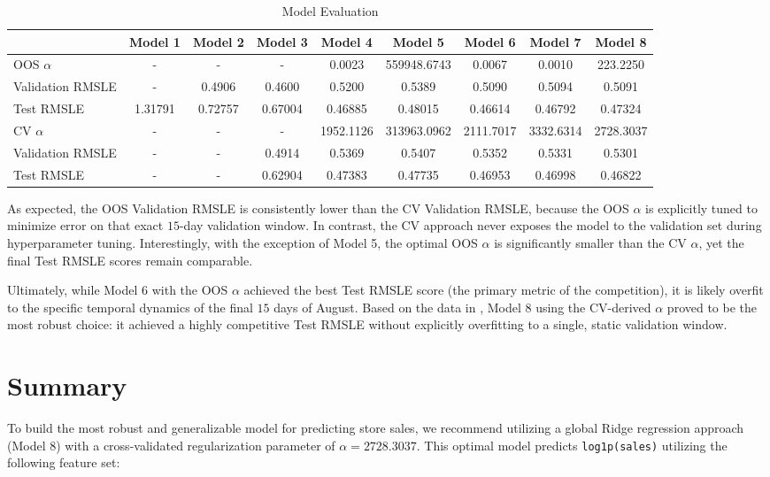 \documentclass{article}
\begin{document}
\begin{table}[H]
\centering
\caption{Model Evaluation}
\label{tab: Model Evaluation}
\begin{tabular}{lcccccccc} 
\toprule
 & Model 1 & Model 2 & Model 3 & Model 4 & Model 5 & Model 6 & Model 7 & Model 8 \\ 
\midrule
OOS $\alpha$ & - & - & - & 0.0023 & 559948.6743 & 0.0067 & 0.0010 & 223.2250 \\ 
Validation RMSLE & - & 0.4906 & 0.4600 & 0.5200 & 0.5389 & 0.5090 & 0.5094 & 0.5091 \\ 
Test RMSLE & 1.31791 & 0.72757 & 0.67004 & 0.46885 & 0.48015 & 0.46614 & 0.46792 & 0.47324 \\ 
\midrule
CV $\alpha$ & - & - & - & 1952.1126 & 313963.0962 & 2111.7017 & 3332.6314 & 2728.3037 \\ 
Validation RMSLE & - & - & 0.4914 & 0.5369 & 0.5407 & 0.5352 & 0.5331 & 0.5301 \\ 
Test RMSLE & - & - & 0.62904 & 0.47383 & 0.47735 & 0.46953 & 0.46998 & 0.46822 \\ 
\bottomrule
\end{tabular}
\end{table}

As expected, the OOS Validation RMSLE is consistently lower than the CV Validation RMSLE, because the OOS $\alpha$ is explicitly tuned to minimize error on that exact $15$-day validation window. In contrast, the CV approach never exposes the model to the validation set during hyperparameter tuning. Interestingly, with the exception of Model 5, the optimal OOS $\alpha$ is significantly smaller than the CV $\alpha$, yet the final Test RMSLE scores remain comparable. 

Ultimately, while Model 6 with the OOS $\alpha$ achieved the best Test RMSLE score (the primary metric of the competition), it is likely overfit to the specific temporal dynamics of the final $15$ days of August. Based on the data in , Model 8 using the CV-derived $\alpha$ proved to be the most robust choice: it achieved a highly competitive Test RMSLE without explicitly overfitting to a single, static validation window.

\section{Summary}

To build the most robust and generalizable model for predicting store sales, we recommend utilizing a global Ridge regression approach (Model 8) with a cross-validated regularization parameter of $\alpha = 2728.3037$. This optimal model predicts \texttt{log1p(sales)} utilizing the following feature set:
\end{document}

